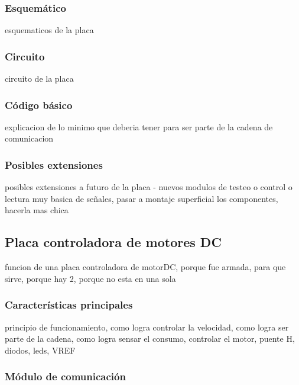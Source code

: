 \subsubsection{Esquem\'atico}
\label{h_placas_generica_esquematicos}

esquematicos de la placa

\subsubsection{Circuito}
\label{h_placas_generica_circuito}

circuito de la placa

\subsubsection{C\'odigo b\'asico}
\label{h_placas_generica_codigo}

explicacion de lo minimo que deberia tener para ser parte de la cadena de comunicacion

\subsubsection{Posibles extensiones}
\label{h_placas_generica_extensiones}

posibles extensiones a futuro de la placa - nuevos modulos de testeo o control o lectura muy basica de señales, pasar a montaje superficial los componentes, hacerla mas chica

\subsection{Placa controladora de motores DC}
\label{h_placas_motorDC}

funcion de una placa controladora de motorDC, porque fue armada, para que sirve, porque hay 2, porque no esta en una sola

\subsubsection{Caracter\'isticas principales}
\label{h_placas_motorDC_caracteristicas}

principio de funcionamiento, como logra controlar la velocidad, como logra ser parte de la cadena, como logra sensar el consumo, controlar el motor, puente H, diodos, leds, VREF

\subsubsection{M\'odulo de comunicaci\'on}
\label{h_placas_motorDC_comm}

